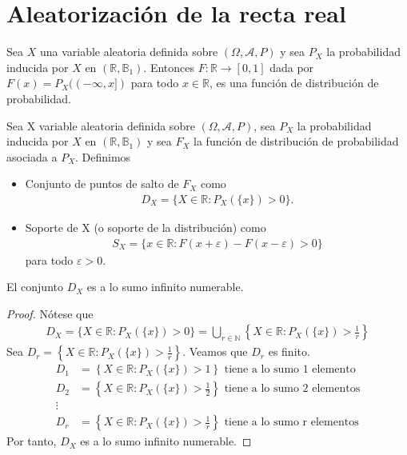 \section{Aleatorización de la recta real}
Sea $X$ una variable aleatoria definida sobre $(\Omega, \mathcal{A}, P)$ y sea $P_X$ la probabilidad inducida por $X$ en $(\mathbb{R}, \mathbb{B}_1)$. Entonces $F: \mathbb{R} \longrightarrow [0,1]$ dada por $F(x) = P_X((-\infty,x])$ para todo $x \in \mathbb{R}$, es una función de distribución de probabilidad.

\begin{defi}
    Sea X variable aleatoria definida sobre $(\Omega, \mathcal{A}, P)$, sea $P_X$ la probabilidad inducida por $X$ en $(\mathbb{R}, \mathbb{B}_1)$ y sea $F_X$ la función de distribución de probabilidad asociada a $P_X$. Definimos
    \begin{itemize}
        \item Conjunto de puntos de salto de $F_X$ como
              \begin{align*}
                  D_X = \{ X \in \mathbb{R} : P_X(\{x\}) > 0 \}.
              \end{align*}
        \item Soporte de X (o soporte de la distribución) como
              \begin{align*}
                  S_X = \{x \in \mathbb{R} : F(x+\varepsilon) - F(x-\varepsilon) > 0 \}
              \end{align*}
              para todo $\varepsilon > 0$.
    \end{itemize}
\end{defi}

\begin{teo}
    El conjunto $D_X$ es a lo sumo infinito numerable.
\end{teo}

\begin{proof}
    Nótese que
    \begin{align*}
        D_X = \{ X \in \mathbb{R} : P_X(\{x\}) > 0 \} = \bigcup_{r \in \mathbb{N}}{\left\{ X \in \mathbb{R} : P_X(\{x\}) > \frac{1}{r} \right\}}
    \end{align*}
    Sea $D_r = \left\{ X \in \mathbb{R} : P_X(\{x\}) > \frac{1}{r} \right\}$. Veamos que $D_r$ es finito.
    \begin{align*}
        D_1    & = \left\{ X \in \mathbb{R} : P_X(\{x\}) > 1 \right\} \text{ tiene a lo sumo 1 elemento}            \\
        D_2    & = \left\{ X \in \mathbb{R} : P_X(\{x\}) > \frac{1}{2} \right\} \text{ tiene a lo sumo 2 elementos} \\
        \vdots &                                                                                                    \\
        D_r    & = \left\{ X \in \mathbb{R} : P_X(\{x\}) > \frac{1}{r} \right\} \text{ tiene a lo sumo r elementos}
    \end{align*}
    Por tanto, $D_X$ es a lo sumo infinito numerable.
\end{proof}

